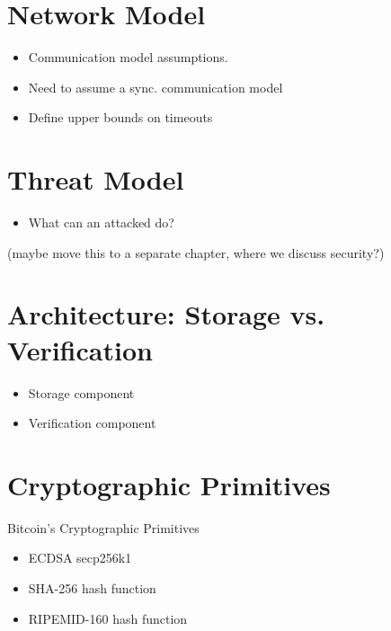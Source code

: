 \documentclass[letterpaper,10pt,english]{sphinxmanual}
\begin{document}
\section{Network Model}
\label{\detokenize{btc-relay:network-model}}\begin{itemize}
\item {} 
Communication model assumptions.

\item {} 
Need to assume a sync. communication model

\item {} 
Define upper bounds on timeouts

\end{itemize}


\section{Threat Model}
\label{\detokenize{btc-relay:threat-model}}\begin{itemize}
\item {} 
What can an attacked do?

\end{itemize}

(maybe move this to a separate chapter, where we discuss security?)


\section{Architecture: Storage vs. Verification}
\label{\detokenize{btc-relay:architecture-storage-vs-verification}}\begin{itemize}
\item {} 
Storage component

\item {} 
Verification component

\end{itemize}


\section{Cryptographic Primitives}
\label{\detokenize{btc-relay:cryptographic-primitives}}
Bitcoin’s Cryptographic Primitives
\begin{itemize}
\item {} 
ECDSA secp256k1

\item {} 
SHA-256 hash function

\item {} 
RIPEMID-160 hash function

\end{itemize}
\end{document}
